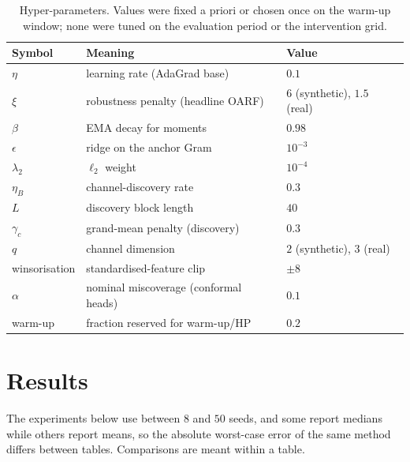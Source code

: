 \documentclass[11pt]{article}
\theoremstyle{plain}
\theoremstyle{remark}
\newcommand{\OARF}{\textsc{OARF}}
\begin{document}
\begin{table}[htbp]
\centering
\caption{Hyper-parameters. Values were fixed a priori or chosen once on the warm-up
window; none were tuned on the evaluation period or the intervention grid.}
\label{tab:hyper}
\small
\begin{tabular}{lll}
\toprule
Symbol & Meaning & Value\\
\midrule
$\eta$ & learning rate (AdaGrad base) & $0.1$\\
$\xi$ & robustness penalty (headline \OARF{}) & $6$ (synthetic), $1.5$ (real)\\
$\beta$ & EMA decay for moments & $0.98$\\
$\epsilon$ & ridge on the anchor Gram & $10^{-3}$\\
$\lambda_2$ & $\ell_2$ weight & $10^{-4}$\\
$\eta_B$ & channel-discovery rate & $0.3$\\
$L$ & discovery block length & $40$\\
$\gamma_c$ & grand-mean penalty (discovery) & $0.3$\\
$q$ & channel dimension & $2$ (synthetic), $3$ (real)\\
winsorisation & standardised-feature clip & $\pm 8$\\
$\alpha$ & nominal miscoverage (conformal heads) & $0.1$\\
warm-up & fraction reserved for warm-up/HP & $0.2$\\
\bottomrule
\end{tabular}
\end{table}

\section{Results}\label{sec:results}

The experiments below use between $8$ and $50$ seeds, and some report medians while others report means, so the absolute worst-case error of the same method differs between tables. Comparisons are meant within a table.
\end{document}
